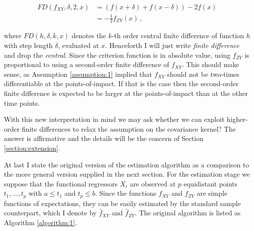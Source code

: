 \begin{align*}
    FD(f_{XY}, \delta, 2, x) &= \left( f(x + \delta) + f(x - \delta) \right) - 2 f(x)\\
                             &= - \frac{1}{2} f_{ZY}(x) \,,
\end{align*}

where $FD(h, \delta, k, x)$ denotes the $k$-th order central finite difference of
function $h$ with step length $\delta$, evaluated at $x$. Henceforth I will just write
\emph{finite difference} and drop the \emph{central}. Since the criterion function is in
absolute value, using $f_{ZY}$ is proportional to using a second-order finite difference
of $f_{XY}$. This should make sense, as Assumption \ref{assumption:1} implied that
$f_{XY}$ should not be two-times differentiable at the points-of-impact. If that is the
case then the second-order finite difference is expected to be larger at the
points-of-impact than at the other time points.


With this new interpretation in mind we may ask whether we can exploit higher-order
finite differences to relax the assumption on the covariance kernel? The answer is
affirmative and the details will be the concern of Section \ref{section:extension}.


At last I state the original version of the estimation algorithm as a comparison to the
more general version supplied in the next section. For the estimation stage we suppose
that the functional regressors $X_i$ are observed at $p$ equidistant points $t_1, \dots,
t_p$ with $a \leq t_1$ and $t_p \leq b$. Since the functions $f_{XY}$ and $f_{ZY}$ are simple
functions of expectations, they can be easily estimated by the standard sample
counterpart, which I denote by $\hat{f}_{XY}$ and $\hat{f}_{ZY}$. The original algorithm
is listed as Algorithm \ref{algorithm:1}.

